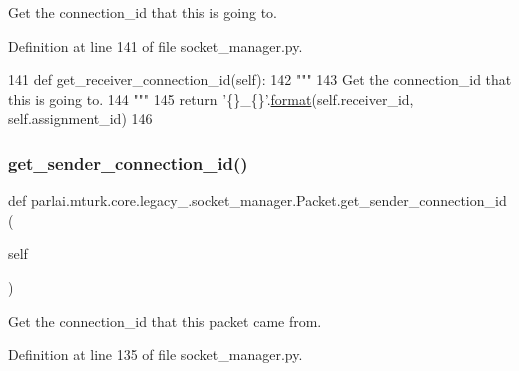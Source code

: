 \begin{DoxyVerb}Get the connection_id that this is going to.
\end{DoxyVerb}
 

Definition at line 141 of file socket\+\_\+manager.\+py.


\begin{DoxyCode}
141     \textcolor{keyword}{def }get\_receiver\_connection\_id(self):
142         \textcolor{stringliteral}{"""}
143 \textcolor{stringliteral}{        Get the connection\_id that this is going to.}
144 \textcolor{stringliteral}{        """}
145         \textcolor{keywordflow}{return} \textcolor{stringliteral}{'\{\}\_\{\}'}.\hyperlink{namespaceparlai_1_1chat__service_1_1services_1_1messenger_1_1shared__utils_a32e2e2022b824fbaf80c747160b52a76}{format}(self.receiver\_id, self.assignment\_id)
146 
\end{DoxyCode}
\mbox{\label{classparlai_1_1mturk_1_1core_1_1legacy__2018_1_1socket__manager_1_1Packet_a023fe8d46cb9a3625ab278d7d72d0823}} 
\subsubsection{\texorpdfstring{get\+\_\+sender\+\_\+connection\+\_\+id()}{get\_sender\_connection\_id()}}
{\footnotesize\ttfamily def parlai.\+mturk.\+core.\+legacy\+\_.\+socket\+\_\+manager.\+Packet.\+get\+\_\+sender\+\_\+connection\+\_\+id (\begin{DoxyParamCaption}\item[{}]{self }\end{DoxyParamCaption})}

\begin{DoxyVerb}Get the connection_id that this packet came from.
\end{DoxyVerb}
 

Definition at line 135 of file socket\+\_\+manager.\+py.



